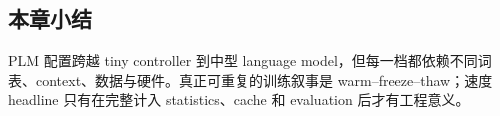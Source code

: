 

\subsection{本章小结}

PLM 配置跨越 tiny controller 到中型 language model，但每一档都依赖不同词表、context、数据与硬件。真正可重复的训练叙事是 warm--freeze--thaw；速度 headline 只有在完整计入 statistics、cache 和 evaluation 后才有工程意义。

